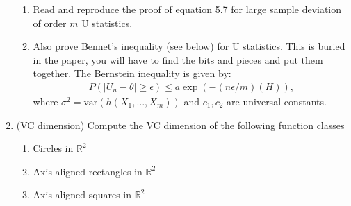 \documentclass[11pt]{article}
\newcommand{\R}{\mathbb{R}}
\newcommand{\var}{\text{var}}
\begin{document}
\begin{enumerate}
 \begin{enumerate}
	\item Read and reproduce the proof of equation 5.7 for large sample deviation of order $m$ U statistics. 
	\item Also prove Bennet's inequality (see below) for U statistics. This is buried in the paper, you will have to find the bits and pieces and put them together. The Bernstein inequality is given by:
	\begin{align*}
		P(|U_n-\theta|\geq \epsilon)\leq a\exp\left(-(n \epsilon/m)(H)\right),
	\end{align*}
	where $\sigma^2=\var(h(X_1,\dots,X_m))$ and $c_1,c_2$ are universal constants.
\end{enumerate}
 \item (VC dimension) Compute the VC dimension of the following function classes
\begin{enumerate}
	\item Circles in $\R^2$
	\item Axis aligned rectangles in $\R^2$
	\item Axis aligned squares in $\R^2$
\end{enumerate}
\end{enumerate}
\end{document}
